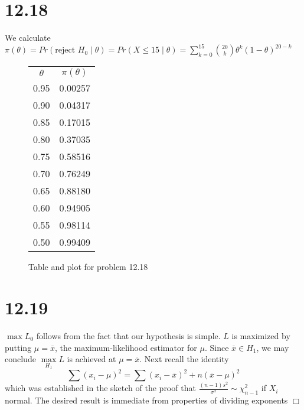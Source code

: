 \documentclass{article}
\begin{document}
\section*{12.18}
We calculate $\pi(\theta) = Pr(\text{reject } H_0 \;|\;\theta) = Pr(X \leqslant 15 \;|\; \theta) = \sum\limits_{k=0}^{15} \binom{20}{k}\theta^k(1-\theta)^{20-k}$
\begin{figure}[ht]
\centering
\begin{minipage}{.5\textwidth}
  \begin{center}
  \begin{tabular}{ c|c }
  $\theta$ & $\pi(\theta)$\\
  \cline{1-2}
  0.95 & 0.00257\\
  0.90 & 0.04317\\
  0.85 & 0.17015\\
  0.80 & 0.37035\\
  0.75 & 0.58516\\
  0.70 & 0.76249\\
  0.65 & 0.88180\\
  0.60 & 0.94905\\
  0.55 & 0.98114\\
  0.50 & 0.99409\\
  \end{tabular}
  \end{center}
  \label{fig:test1}
\end{minipage}%
\begin{minipage}{.5\textwidth}
  \centering
  \label{fig:test2}
\end{minipage}
\caption{Table and plot for problem 12.18}
\end{figure}

\section*{12.19}
$\max L_0$ follows from the fact that our hypothesis is simple. $L$ is maximized by putting $\mu = \overline{x}$, the maximum-likelihood estimator for $\mu$. Since $\overline{x} \in H_1$, we may conclude $\max\limits_{H_1} L$ is achieved at $\mu = \overline{x}$. Next recall the identity
$$\sum (x_i - \mu)^2 = \sum (x_i - \overline{x})^2 + n(\overline{x}-\mu)^2$$
which was established in the sketch of the proof that $\frac{(n-1)s^2}{\sigma^2} \sim \chi^2_{n-1}$ if $X_i$ normal. The desired result is immediate from properties of dividing exponents $\Box$
\end{document}
